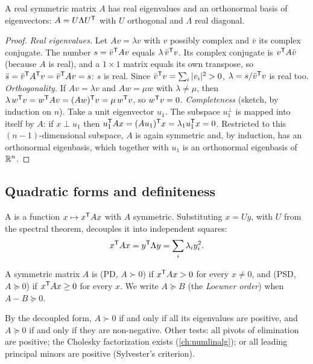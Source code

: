 \begin{theorem}
\label{thm:spectral}
A real symmetric matrix $A$ has real eigenvalues and an orthonormal basis of eigenvectors:
$A = U\Lambda U^{\mathsf{T}}$ with $U$ orthogonal and $\Lambda$ real diagonal.
\end{theorem}
\begin{proof}
\emph{Real eigenvalues.} Let $Av = \lambda v$ with $v$ possibly complex and $\bar v$ its complex conjugate. The number
$s = \bar v^{\mathsf{T}} Av$ equals $\lambda\,\bar v^{\mathsf{T}} v$. Its complex conjugate is $v^{\mathsf{T}} A\bar v$ (because $A$ is real), and a $1\times1$ matrix equals its
own transpose, so $\bar s = \bar v^{\mathsf{T}} A^{\mathsf{T}} v = \bar v^{\mathsf{T}} Av = s$: $s$ is real. Since $\bar v^{\mathsf{T}} v = \sum_i|v_i|^2 > 0$,
$\lambda = s/\bar v^{\mathsf{T}} v$ is real too.
\emph{Orthogonality.} If $Av = \lambda v$ and $Aw = \mu w$ with $\lambda \ne \mu$, then
$\lambda\,w^{\mathsf{T}} v = w^{\mathsf{T}} Av = (Aw)^{\mathsf{T}} v = \mu\,w^{\mathsf{T}} v$, so $w^{\mathsf{T}} v = 0$.
\emph{Completeness} (sketch, by induction on $n$). Take a unit eigenvector $u_1$. The subspace $u_1^\perp$ is mapped into itself
by $A$: if $x \perp u_1$ then $u_1^{\mathsf{T}} Ax = (Au_1)^{\mathsf{T}} x = \lambda_1u_1^{\mathsf{T}} x = 0$. Restricted to this $(n-1)$-dimensional subspace, $A$ is
again symmetric and, by induction, has an orthonormal eigenbasis, which together with $u_1$ is an orthonormal eigenbasis
of $\mathbb{R}^n$.
\end{proof}

\subsection{Quadratic forms and definiteness}

A  is a function $x \mapsto x^{\mathsf{T}} Ax$ with $A$ symmetric. Substituting $x = Uy$, with $U$ from the
spectral theorem, decouples it into independent squares:
\begin{equation}
  x^{\mathsf{T}} Ax = y^{\mathsf{T}}\Lambda y = \sum_i\lambda_iy_i^2 .
\end{equation}

\begin{definition}[Definiteness]
A symmetric matrix $A$ is  (PD, $A \succ 0$) if $x^{\mathsf{T}} Ax > 0$ for every $x \ne 0$, and
 (PSD, $A \succeq 0$) if $x^{\mathsf{T}} Ax \ge 0$ for every $x$. We write $A \succeq B$ (the
\emph{Loewner order}) when $A - B \succeq 0$.
\end{definition}

By the decoupled form, $A \succ 0$ if and only if all its eigenvalues are positive, and $A \succeq 0$ if and only if they are
non-negative. Other tests: all pivots of elimination are positive; the Cholesky factorization exists
(\cref{ch:numlinalg}); or all leading principal minors are positive (Sylvester's criterion).

